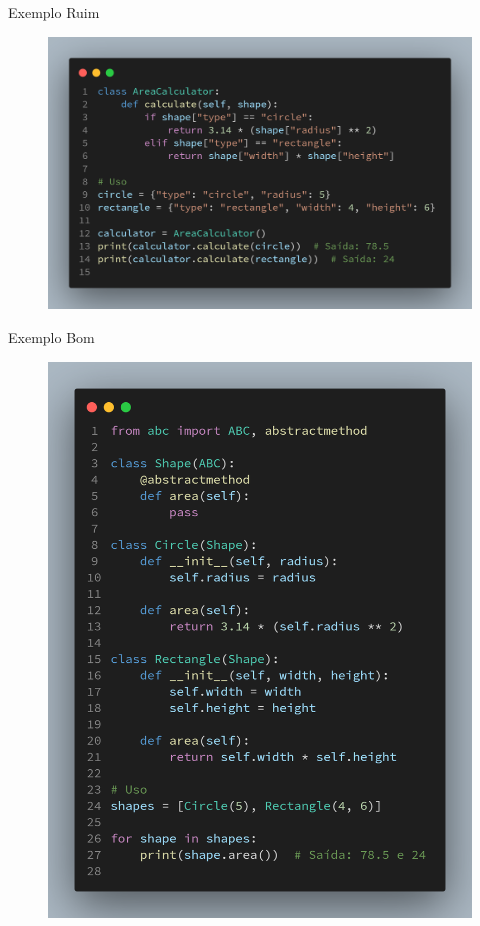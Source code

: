 \documentclass{libs/ufc_format}
\begin{document}
\begin{frame}{Exemplo \textcolor{gred}{Ruim}}
    \begin{figure}
        \centering
        \includegraphics[scale=0.17]{images/o_exemple_bad.png}
    \end{figure}
\end{frame}

\begin{frame}{Exemplo \textcolor{ggreen}{Bom}}
    \begin{figure}
        \centering
        \includegraphics[scale=0.13]{images/o_exemple_good.png}
    \end{figure}
\end{frame}
\end{document}
